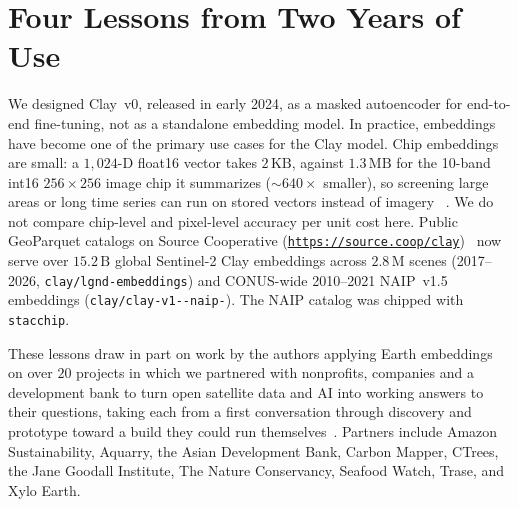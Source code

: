 \section{Four Lessons from Two Years of Use}
\label{sec:lessons}

We designed Clay~v0, released in early 2024, as a masked autoencoder for end-to-end fine-tuning, not as a standalone embedding model. In practice, embeddings have become one of the primary use cases for the Clay model. Chip embeddings are small: a $1{,}024$-D float16 vector takes $2\,\text{KB}$, against $1.3\,\text{MB}$ for the 10-band int16 $256\times 256$ image chip it summarizes (${\sim}640\times$ smaller), so screening large areas or long time series can run on stored vectors instead of imagery ~\cite{gomes2024nec,vinge2025neucobench}. We do not compare chip-level and pixel-level accuracy per unit cost here. Public GeoParquet catalogs on Source Cooperative (\href{https://source.coop/clay}{\texttt{https://\allowbreak source.\allowbreak coop/\allowbreak clay}})~\cite{clay2026sourcecoop} now serve over $15.2\,\text{B}$ global Sentinel-2 Clay embeddings across $2.8\,\text{M}$ scenes (2017--2026, \texttt{clay/\allowbreak lgnd-\allowbreak embeddings}) and CONUS-wide 2010--2021 NAIP~v1.5 embeddings (\texttt{clay/\allowbreak clay-\allowbreak v1--\allowbreak naip-}). The NAIP catalog was chipped with \texttt{stacchip}.

These lessons draw in part on work by the authors applying Earth embeddings on over $20$ projects in which we partnered with nonprofits, companies and a development bank to turn open satellite data and AI into working answers to their questions, taking each from a first conversation through discovery and prototype toward a build they could run themselves~\cite{grimshaw2026soy,chen2026aquaculture}. Partners include Amazon Sustainability, Aquarry, the Asian Development Bank, Carbon Mapper, CTrees, the Jane Goodall Institute, The Nature Conservancy, Seafood Watch, Trase, and Xylo Earth.

